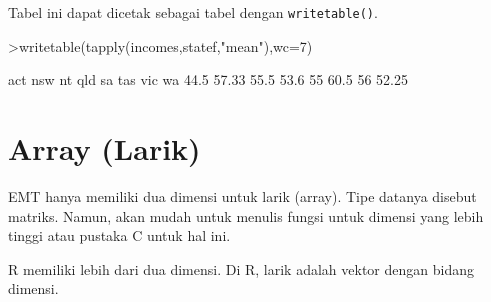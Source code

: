 \documentclass[a4paper,11pt,oneside,enabledeprecatedfontcommands]{scrbook}
\newenvironment{eulernotebook}{}{}
\newcommand{\eulerheading}[1]{\chapter{#1}}
\newenvironment{eulercomment}{\par\medskip\noindent}{\par\medskip}
\begin{document}
\begin{eulernotebook}
\begin{eulercomment}
			Tabel ini dapat dicetak sebagai tabel dengan \texttt{writetable()}.
		\end{eulercomment}
		\begin{eulerprompt}
			>writetable(tapply(incomes,statef,"mean"),wc=7)
		\end{eulerprompt}
		\begin{euleroutput}
			    act    nsw     nt    qld     sa    tas    vic     wa
			   44.5  57.33   55.5   53.6     55   60.5     56  52.25
		\end{euleroutput}
		
		\eulerheading{Array (Larik)}
		\begin{eulercomment}
			EMT hanya memiliki dua dimensi untuk larik (array). Tipe datanya disebut matriks. Namun, akan mudah
			untuk menulis fungsi untuk dimensi yang lebih tinggi atau pustaka C untuk hal ini.
			
			R memiliki lebih dari dua dimensi. Di R, larik adalah vektor dengan bidang dimensi.
			

\end{eulercomment}
\end{eulernotebook}
\end{document}
